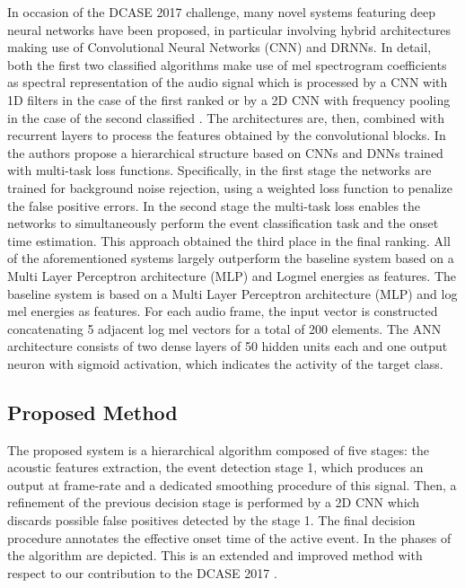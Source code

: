 In occasion of the DCASE 2017 challenge, many novel systems featuring deep neural networks have been proposed, in particular involving hybrid architectures making use of Convolutional Neural Networks (CNN) and DRNNs. In detail, both the first two classified algorithms make use of mel spectrogram coefficients as spectral representation of the audio signal which is processed by a CNN with 1D filters in the case of the first ranked \cite{limrare} or by a 2D CNN with frequency pooling in the case of the second classified \cite{cakirconvolutional}. The architectures are, then, combined with recurrent layers to process the features obtained by the convolutional blocks.
In \cite{phan2017dnn} the authors propose a hierarchical structure based on CNNs and DNNs trained with multi-task loss functions. Specifically, in the first stage the networks are trained for background noise rejection, using a weighted loss function to penalize the false positive errors. In the second stage the multi-task loss enables the networks to simultaneously perform the event classification task and the onset time estimation. This approach obtained the third place in the final ranking. 
All of the aforementioned systems largely outperform the baseline system based on a Multi Layer Perceptron architecture (MLP) and Logmel energies as features.
The baseline system \cite{DCASE2017challenge} is based on a Multi Layer Perceptron architecture (MLP) and log mel energies as features. For each audio frame, the input vector is constructed concatenating 5 adjacent log mel vectors for a total of 200 elements. The ANN architecture consists of two dense layers of 50 hidden units each and one output neuron with sigmoid activation, which indicates the activity of the target class.

\subsection{Proposed Method}
The proposed system is a hierarchical algorithm composed of five stages: the acoustic features extraction, the event detection stage 1,  which produces an output at frame-rate and a dedicated smoothing procedure of this signal.
Then, a refinement of the previous decision stage is performed by a 2D CNN which discards possible false positives detected by the stage 1. The final decision procedure annotates the effective onset time of the active event. In  the phases of the algorithm are depicted. This is an extended and improved method with respect to our contribution to the DCASE 2017 \cite{vesperinihierarchic}.

